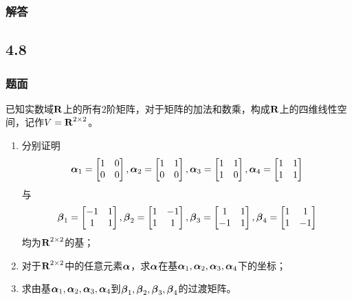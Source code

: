 \documentclass{beamer}
\begin{document}
\begin{frame}
    \frametitle{解答}



\end{frame}

\subsection*{4.8}
\begin{frame}
    \frametitle{题面}

    已知实数域\(\boldsymbol{\mathrm{R}}\)上的所有\(2\)阶矩阵，对于矩阵的加法和数乘，构成\(\boldsymbol{\mathrm{R}}\)上的四维线性空间，记作\(V=\boldsymbol{\mathrm{R}}^{2\times2}\)。
    \begin{enumerate}
        \item {
              分别证明
              \begin{equation*}
                  \boldsymbol{\alpha}_1=\begin{bmatrix}1&0\\0&0\end{bmatrix},
                  \boldsymbol{\alpha}_2=\begin{bmatrix}1&1\\0&0\end{bmatrix},
                  \boldsymbol{\alpha}_3=\begin{bmatrix}1&1\\1&0\end{bmatrix},
                  \boldsymbol{\alpha}_4=\begin{bmatrix}1&1\\1&1\end{bmatrix}
              \end{equation*}
              与
              \begin{equation*}
                  \boldsymbol{\beta}_1=\begin{bmatrix}-1&1\\1&1\end{bmatrix},
                  \boldsymbol{\beta}_2=\begin{bmatrix}1&-1\\1&1\end{bmatrix},
                  \boldsymbol{\beta}_3=\begin{bmatrix}1&1\\-1&1\end{bmatrix},
                  \boldsymbol{\beta}_4=\begin{bmatrix}1&1\\1&-1\end{bmatrix}
              \end{equation*}
              均为\(\boldsymbol{\mathrm{R}}^{2\times2}\)的基；}
        \item 对于\(\boldsymbol{\mathrm{R}}^{2\times2}\)中的任意元素\(\boldsymbol{\alpha}\)，求\(\boldsymbol{\alpha}\)在基\(\boldsymbol{\alpha}_1,\boldsymbol{\alpha}_2,\boldsymbol{\alpha}_3,\boldsymbol{\alpha}_4\)下的坐标；
        \item 求由基\(\boldsymbol{\alpha}_1,\boldsymbol{\alpha}_2,\boldsymbol{\alpha}_3,\boldsymbol{\alpha}_4\)到\(\boldsymbol{\beta}_1,\boldsymbol{\beta}_2,\boldsymbol{\beta}_3,\boldsymbol{\beta}_4\)的过渡矩阵。
    \end{enumerate}

\end{frame}
\end{document}
